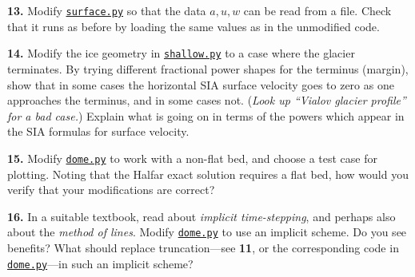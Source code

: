 \documentclass[12pt]{amsart}
\newcommand{\prob}[1]{\medskip\noindent\textbf{#1.}\quad }
\begin{document}
\prob{13}  Modify \href{https://github.com/bueler/mccarthy/blob/master/py/surface.py}{\texttt{surface.py}} so that the data $a,u,w$ can be read from a file.  Check that it runs as before by loading the same values as in the unmodified code.

\prob{14}  Modify the ice geometry in \href{https://github.com/bueler/mccarthy/blob/master/py/shallow.py}{\texttt{shallow.py}} to a case where the glacier terminates.  By trying different fractional power shapes for the terminus (margin), show that in some cases the horizontal SIA surface velocity goes to zero as one approaches the terminus, and in some cases not.  (\emph{Look up ``Vialov glacier profile'' for a bad case.})  Explain what is going on in terms of the powers which appear in the SIA formulas for surface velocity.

\prob{15}  Modify \href{https://github.com/bueler/mccarthy/blob/master/py/dome.py}{\texttt{dome.py}} to work with a non-flat bed, and choose a test case for plotting.  Noting that the Halfar exact solution requires a flat bed, how would you verify that your modifications are correct?

\prob{16}  In a suitable textbook, read about \emph{implicit time-stepping}, and perhaps also about the \emph{method of lines}.  Modify \href{https://github.com/bueler/mccarthy/blob/master/py/dome.py}{\texttt{dome.py}} to use an implicit scheme.  Do you see benefits?  What should replace truncation---see \textbf{11}, or the corresponding code in \href{https://github.com/bueler/mccarthy/blob/master/py/dome.py}{\texttt{dome.py}}---in such an implicit scheme?
\end{document}
